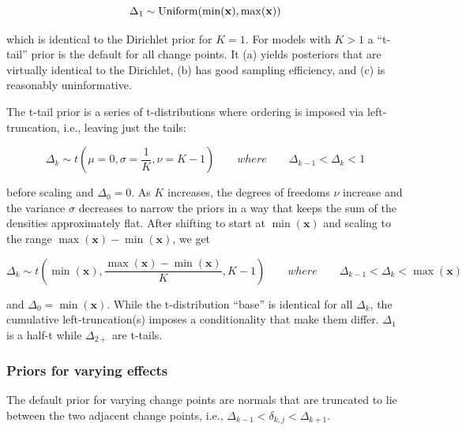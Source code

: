 \documentclass[
  american,
]{article}
\begin{document}
\begin{equation}
\Delta_1 \sim {\rm Uniform}(\min(\mathbf{x}), \max(\mathbf{x}))
\end{equation}

which is identical to the Dirichlet prior for \(K = 1\). For models with \(K > 1\) a ``t-tail'' prior is the default for all change points. It (a) yields posteriors that are virtually identical to the Dirichlet, (b) has good sampling efficiency, and (c) is reasonably uninformative.

The t-tail prior is a series of t-distributions where ordering is imposed via left-truncation, i.e., leaving just the tails:

\begin{equation}
\Delta_k \sim t(\mu = 0, \sigma = \frac{1}{K}, \nu = K-1) \hspace{2em} where \hspace{2em} \Delta_{k-1} < \Delta_k < 1
\end{equation}

before scaling and \(\Delta_0 = 0\). As \(K\) increases, the degrees of freedoms \(\nu\) increase and the variance \(\sigma\) decreases to narrow the priors in a way that keeps the sum of the densities approximately flat. After shifting to start at \(\min(\mathbf{x})\) and scaling to the range \(\max(\mathbf{x}) - \min(\mathbf{x})\), we get

\begin{equation}
\Delta_k \sim t(\min(\mathbf{x}), \frac{\max(\mathbf{x}) - \min(\mathbf{x})}{K}, K-1) \hspace{2em} where \hspace{2em} \Delta_{k-1} < \Delta_k < \max(\mathbf{x})
\end{equation}

and \(\Delta_0 = \min(\mathbf{x})\). While the t-distribution ``base'' is identical for all \(\Delta_k\), the cumulative left-truncation(s) imposes a conditionality that make them differ. \(\Delta_1\) is a half-t while \(\Delta_{2+}\) are t-tails.

\hypertarget{priors-for-varying-effects}{%
\subsubsection{Priors for varying effects}\label{priors-for-varying-effects}}

The default prior for varying change points are normals that are truncated to lie between the two adjacent change points, i.e., \(\Delta_{k-1} < \delta_{k, j} < \Delta_{k + 1}\).
\end{document}
